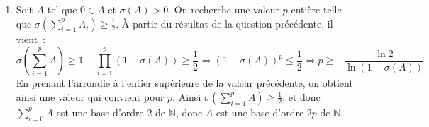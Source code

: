 \documentclass{article}
\begin{document}
\begin{enumerate}
    \item Soit $A$ tel que $0 \in A$ et $\sigma(A) > 0$. On recherche une valeur $p$ entière telle que $\sigma(\sum_{i = 1}^p A_i) \geqslant \frac{1}{2}$. À partir du résultat de la question précédente, il vient~:
    \[
      \sigma\left(\sum_{i = 1}^p A\right) \geqslant 1 - \prod_{i = 1}^p (1 - \sigma(A)) \geqslant \frac{1}{2} \iff (1 - \sigma(A))^p \leqslant \frac{1}{2} \iff p \geqslant - \frac{\ln 2}{\ln (1 - \sigma(A))}
    \]
    En prenant l'arrondie à l'entier supérieure de la valeur précédente, on obtient ainsi une valeur qui convient pour $p$. Ainsi $\sigma(\sum_{i = 1}^p A) \geqslant \frac{1}{2}$, et donc $\sum_{i = 0}^p A$ est une base d'ordre 2 de $\mathbb{N}$, donc $A$ est une base d'ordre $2p$ de $\mathbb{N}$.
  \end{enumerate}
\end{document}

